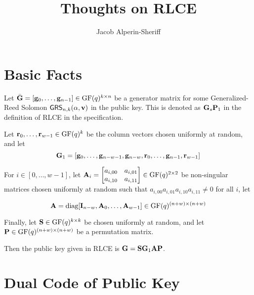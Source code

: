 \documentclass[oribibl,envcountsect,envcountsame]{llncs}
\title{Thoughts on RLCE}
\author{%
  Jacob Alperin-Sheriff
}
\institute{NIST
  \email{jacob.alperin-sheriff@nist.gov}
}
\newcommand{\GRS}{\textsf{GRS}}
\newcommand{\GF}{\text{GF}}
\begin{document}

\maketitle
\thispagestyle{plain}
%  
%  
%




\section{Basic Facts}

Let $\bar{\matG}=[\vecg_0, \ldots, \vecg_{n-1}] \in \GF(q)^{k \times n}$ be a
generator matrix for some Generalized-Reed Solomon $\GRS_{n,k}(\vecalpha,\vecv)$ in the public
key. This is denoted as $\mathbf{G}_{s}\mathbf{P}_{1}$ in the
definition of RLCE in the specification.

Let $\vecr_0, \ldots, \vecr_{w-1} \in \GF(q)^{k}$ be the column vectors
chosen uniformly at random, and let 
\[\mathbf{G}_{1}= [\mathbf{g}_0, \ldots, \mathbf{g}_{n-w-1}, \mathbf{g}_{n-w},
\mathbf{r}_0, \ldots, \mathbf{g}_{n-1}, \mathbf{r}_{w-1}]\]

For $i \in [0,\ldots,w-1]$, let $\matA_{i}
= \begin{bmatrix}a_{i,00}&a_{i,01}\\a_{i,10}&a_{i,11}\end{bmatrix} \in
\GF(q)^{2 \times 2}$ be non-singular matrices chosen uniformly at
random such that 
$a_{i,00}a_{i,01}a_{i,10}a_{i,11}\neq 0$ for all $i$, let 

\[\matA=\text{diag}[\matI_{n-w}, \matA_{0}, \ldots, \matA_{w-1}] \in
  \GF(q)^{(n + w) \times (n+w)}\]

Finally, let $\matS \in \GF(q)^{k \times k}$ be chosen uniformly at
random, and let $\matP \in \GF(q)^{(n+w)\times (n+w)}$ be a
permutation matrix. 

Then the public key given in RLCE is $\mathbf{G}=\mathbf{S}\mathbf{G}_1\mathbf{A}\mathbf{P}$. 


\section{Dual Code of Public Key}
\label{sec:dual-code}
\end{document}
